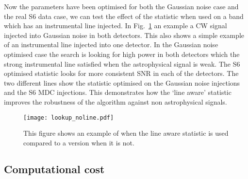 Now the parameters have been optimised for both the Gaussian noise case and the real S6 data case, we can test the effect of the statistic when used on a band which has an instrumental line injected. 
In Fig.~\ref{viterbi:optimisation:vitexample} an example a \ac{CW} signal injected into Gaussian noise in both detectors. 
This also shows a simple example of an instrumental line injected into one detector. 
In the Gaussian noise optimised case the search is looking for high power in both detectors which the strong instrumental line satisfied when the astrophysical signal is weak. 
The S6 optimised statistic looks for more consistent \ac{SNR} in each of the detectors.
The two different lines show the statistic optimised on the Gaussian noise injections and the S6 \ac{MDC} injections.
This demonstrates how the `line aware' statistic improves the robustness of the algorithm against non astrophysical signals. 

\begin{figure}
    \centering
    \texttt{[image: lookup\_noline.pdf]}
    \caption{This figure shows an example of when the line aware statistic is used compared to a version when it is not.}
    \label{viterbi:optimisation:vitexample}
\end{figure}



\subsection{\label{results:time}Computational cost}


